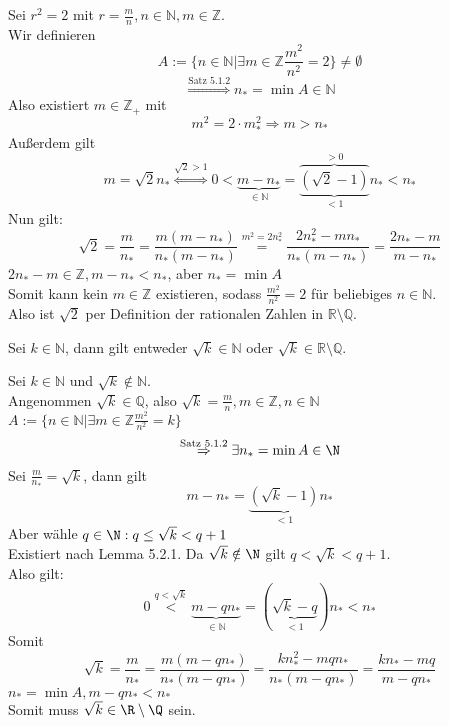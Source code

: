 \documentclass[../ana1.tex]{subfiles}
\begin{document}
\begin{bew}
	Sei $r^2=2$ mit $r = \frac{m}{n}, n\in\mathbb{N}, m\in\mathbb{Z}$.\\
	Wir definieren $$A:= \{n\in\mathbb{N}|\exists m\in\mathbb{Z} \frac{m^2}{n^2}= 2\} \neq \emptyset$$
	$$\overset{\text{Satz 5.1.2}}{\Rightarrow} n_* = \min A \in \mathbb{N}$$
	Also existiert $m\in\mathbb{Z}_+$ mit
	$$m^2 = 2\cdot m_*^2 \Rightarrow m>n_*$$
	Außerdem gilt
	$$m=\sqrt{2}n_* \overset{\sqrt{2}>1}{\Leftrightarrow} 0< \underbrace{m-n_*}_{\in\mathbb{N}} = \underbrace{\overbrace{(\sqrt{2} - 1)}}^{>0}_{<1} n_* < n_*$$
	Nun gilt: $$\sqrt{2} = \frac{m}{n_*} = \frac{m(m-n_*)}{n_*(m-n_*)} \overset{m^2=2n_*^2}{=} \frac{2n_*^2-mn_*}{n_*(m-n_*)} = \frac{2n_*-m}{m-n_*}$$
	\Lightning $2n_* -m \in \mathbb{Z}, m-n_* < n_*$, aber $n_* = \min A$\\
	Somit kann kein $m\in\mathbb{Z}$ existieren, sodass $\frac{m^2}{n^2} = 2$ für beliebiges $n\in\mathbb{N}.$\\
	Also ist $\sqrt{2}$ per Definition der rationalen Zahlen in $\mathbb{R}\setminus\mathbb{Q}$.
\end{bew}
\begin{satz}
	Sei $k\in\mathbb{N}$, dann gilt entweder $\sqrt{k}\in\mathbb{N}$ oder $\sqrt{k}\in\mathbb{R}\setminus\mathbb{Q}$.
\end{satz}
\begin{bew}
	Sei $k\in\mathbb{N}$ und $\sqrt{k} \notin \mathbb{N}$.\\
	Angenommen $\sqrt{k}\in\mathbb{Q}$, also $\sqrt{k} = \frac{m}{n}, m\in\mathbb{Z},n\in\mathbb{N}$\\
	$A:=\{n\in\mathbb{N}|\exists m\in\mathbb{Z} \frac{m^2}{n^2} = k\}$
	$$\overset{\text{Satz 5.1.2}}{\Rightarrow}\exists n_* = \min A \in \N$$
	Sei $\frac{m}{n_*} = \sqrt{k}$, dann gilt
	$$m-n_* = \underbrace{(\sqrt{k}-1)}_{<1} n_*$$ %
	Aber wähle $q\in\N: q\leq \sqrt{k} < q+1$\\
	Existiert nach Lemma 5.2.1. Da $\sqrt{k} \notin \N$ gilt $q<\sqrt{k}<q+1$.\\
	Also gilt:
	$$0\overset{q<\sqrt{k}}{<} \underbrace{m-qn_*}_{\in\mathbb{N}} = (\underbrace{\sqrt{k}-q}_{<1})n_* < n_*$$
	Somit $$\sqrt{k} = \frac{m}{n_*} = \frac{m(m-qn_*)}{n_*(m-qn_*)} = \frac{kn_*^2 - mqn_*}{n_*(m-qn_*)}=\frac{kn_*-mq}{m-qn_*}$$
	\Lightning $n_* = \min A, m-qn_* < n_*$\\
	Somit muss $\sqrt{k}\in\R\setminus\Q$ sein.
\end{bew}
\end{document}
